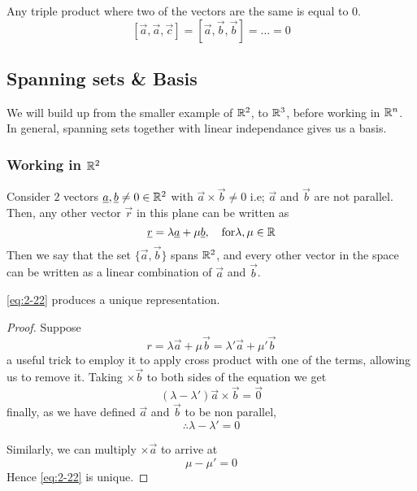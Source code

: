 \documentclass{article}
\numberwithin{equation}{section}
\begin{document}
\begin{cor}
    Any triple product where two of the vectors are the same is equal to $0$.
    \[
        [\vec{a}, \vec{a}, \vec{c}] = [\vec{a}, \vec{b}, \vec{b}] = \ldots = 0  
    \]
\end{cor}

\subsection{Spanning sets \& Basis}
We will build up from the smaller example of $\mathbb{R}^2$, to $\mathbb{R}^3$, before working in $\mathbb{R}^n$. In general, spanning sets together with linear independance gives us a basis.

\subsubsection*{Working in $\mathbb{R}^2$}
\begin{defi}
    Consider $2$ vectors $\underline{a}, \underline{b} \neq 0 \in \mathbb{R}^2$ with $\vec{a} \times \vec{b} \neq 0$ i.e; $\vec{a}$ and $\vec{b}$ are not parallel. Then, any other vector $\vec{r}$ in this plane can be written as 
    \begin{equation}
        \underline{r} = \lambda \underline{a} + \mu \underline{b}, \quad \text{for} \lambda, \mu \in \mathbb{R} \label{eq:2-22}
    \end{equation}
    Then we say that the set $\{\vec{a}, \vec{b}\}$ spans $\mathbb{R}^2$, and every other vector in the space can be written as a linear combination of $\vec{a}$ and $\vec{b}$.
\end{defi}

\begin{prop}
    \eqref{eq:2-22} produces a unique representation.
\end{prop}

\begin{proof}
    Suppose 
    \[
        r = \lambda \vec{a} + \mu \vec{b} = \lambda' \vec{a} + \mu' \vec{b}    
    \]
    a useful trick to employ it to apply cross product with one of the terms, allowing us to remove it. Taking $\times \vec{b}$ to both sides of the equation we get
    \[
        (\lambda - \lambda')\vec{a} \times \vec{b} = \vec{0}  
    \]
    finally, as we have defined $\vec{a}$ and $\vec{b}$ to be non parallel,
    \[
        \therefore \lambda - \lambda' = 0
    \]

    Similarly, we can multiply $\times \vec{a}$ to arrive at
    \[
        \mu - \mu' = 0  
    \]
    Hence \eqref{eq:2-22} is unique.
\end{proof}
\end{document}
